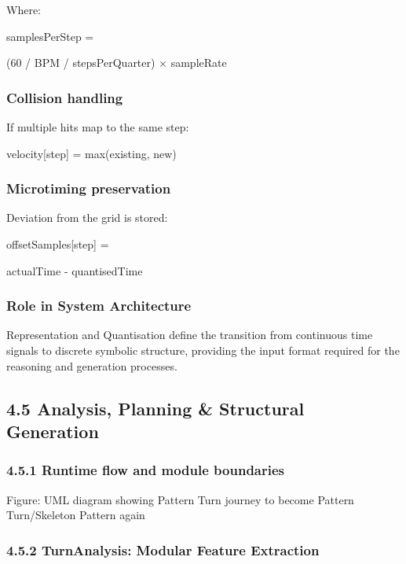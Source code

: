 Where:

samplesPerStep =

(60 / BPM / stepsPerQuarter) × sampleRate

\subsubsection{Collision handling}\label{collision-handling}

If multiple hits map to the same step:

velocity{[}step{]} = max(existing, new)

\subsubsection{Microtiming preservation}\label{microtiming-preservation}

Deviation from the grid is stored:

offsetSamples{[}step{]} =

actualTime - quantisedTime

\subsubsection{Role in System
Architecture}\label{role-in-system-architecture-2}

Representation and Quantisation define the transition from continuous
time signals to discrete symbolic structure, providing the input format
required for the reasoning and generation processes.

\subsection{4.5 Analysis, Planning \& Structural
Generation}\label{analysis-planning-structural-generation}

\subsubsection{4.5.1 Runtime flow and module
boundaries}\label{runtime-flow-and-module-boundaries}

Figure: UML diagram showing Pattern Turn journey to become Pattern
Turn/Skeleton Pattern again

\subsubsection{4.5.2 TurnAnalysis: Modular Feature
Extraction}\label{turnanalysis-modular-feature-extraction}

